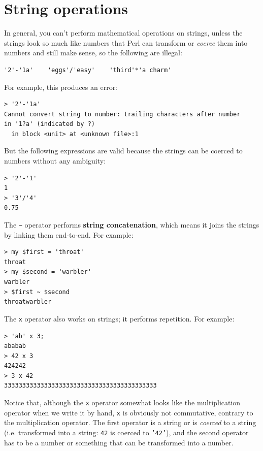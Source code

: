 \section{String operations}
\label{string_operations}

In general, you can't perform mathematical operations on strings, unless
the strings look so much like numbers that Perl can transform or \emph{coerce} them into numbers and still make sense, so the 
following are illegal:

\begin{verbatim}
'2'-'1a'    'eggs'/'easy'    'third'*'a charm'
\end{verbatim}
%

For example, this produces an error:

\begin{verbatim}
> '2'-'1a'
Cannot convert string to number: trailing characters after number 
in '1?a' (indicated by ?)
  in block <unit> at <unknown file>:1
\end{verbatim}
%
  
But the following expressions are valid because the strings 
can be coerced to numbers without any ambiguity:
\begin{verbatim}
> '2'-'1'
1
> '3'/'4'
0.75
\end{verbatim}
%

The \verb'~' operator performs {\bf string concatenation}, which means
it joins the strings by linking them end-to-end.  For example:

\begin{verbatim}
> my $first = 'throat'
throat
> my $second = 'warbler'
warbler
> $first ~ $second
throatwarbler
\end{verbatim}
%
The {\tt x} operator also works on strings; it performs repetition.
For example:

\begin{verbatim}
> 'ab' x 3;
ababab
> 42 x 3
424242
> 3 x 42
333333333333333333333333333333333333333333
\end{verbatim}

Notice that, although the {\tt x} operator somewhat looks like 
the multiplication operator when we write it by hand, {\tt x} 
is obviously not commutative, contrary to the {\tt *} 
multiplication operator. The first operator is a string or is 
\emph{coerced} to a string (i.e. transformed into a string: 
{\tt 42} is coerced to {\tt '42'}), and the second operator 
has to be a number or something that can be transformed 
into a number.


